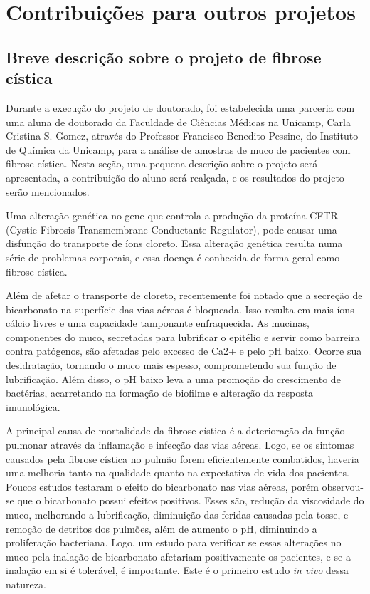 \part{Contribuições para outros projetos}

	\chapter{Breve descrição sobre o projeto de fibrose cística}

	Durante a execução do projeto de doutorado, foi estabelecida uma parceria com uma aluna de doutorado da Faculdade de Ciências Médicas na Unicamp, Carla Cristina S. Gomez, através do Professor Francisco Benedito Pessine, do Instituto de Química da Unicamp, para a análise de amostras de muco de pacientes com fibrose cística. Nesta seção, uma pequena descrição sobre o projeto será apresentada, a contribuição do aluno será realçada, e os resultados do projeto serão mencionados.
	
	Uma alteração genética no gene que controla a produção da proteína CFTR (Cystic Fibrosis Transmembrane Conductante Regulator), pode causar uma disfunção do transporte de íons cloreto. Essa alteração genética resulta numa série de problemas corporais, e essa doença é conhecida de forma geral como fibrose cística. %
	
	Além de afetar o transporte de cloreto, recentemente foi notado que a secreção de bicarbonato na superfície das vias aéreas é bloqueada. Isso resulta em mais íons cálcio livres e uma capacidade tamponante enfraquecida. As mucinas, componentes do muco, secretadas para lubrificar o epitélio e servir como barreira contra patógenos, são afetadas pelo excesso de Ca2+ e pelo pH baixo. Ocorre sua desidratação, tornando o muco mais espesso, comprometendo sua função de lubrificação. Além disso, o pH baixo leva a uma promoção do crescimento de bactérias, acarretando na formação de biofilme e alteração da resposta imunológica.
	
	A principal causa de mortalidade da fibrose cística é a deterioração da função pulmonar através da inflamação e infecção das vias aéreas. Logo, se os sintomas causados pela fibrose cística no pulmão forem eficientemente combatidos, haveria uma melhoria tanto na qualidade quanto na expectativa de vida dos pacientes. Poucos estudos testaram o efeito do bicarbonato nas vias aéreas, porém observou-se que o bicarbonato possui efeitos positivos. Esses são, redução da viscosidade do muco, melhorando a lubrificação, diminuição das feridas causadas pela tosse, e remoção de detritos dos pulmões, além de aumento o pH, diminuindo a proliferação bacteriana. Logo, um estudo para verificar se essas alterações no muco pela inalação de bicarbonato afetariam positivamente os pacientes, e se a inalação em si é tolerável, é importante. Este é o primeiro estudo \emph{in vivo} dessa natureza.
	
